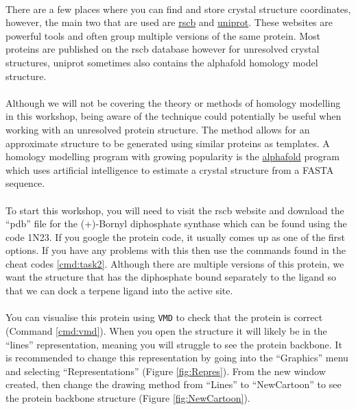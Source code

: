   \paragraph{}
  There are a few places where you can find and store crystal structure coordinates, however, the main two that are used are \href{https://www.rcsb.org/}{rscb} and \href{https://www.uniprot.org/}{uniprot}. These websites are powerful tools and often group multiple versions of the same protein. Most proteins are published on the rscb database however for unresolved crystal structures, uniprot sometimes also contains the alphafold\cite{Varadi2022AlphaFoldModels} homology model structure. 

  \paragraph{}
  Although we will not be covering the theory or methods of homology modelling in this workshop, being aware of the technique could potentially be useful when working with an unresolved protein structure. The method allows for an approximate structure to be generated using similar proteins as templates. A homology modelling program with growing popularity is the \href{https://www.deepmind.com/research/highlighted-research/alphafold}{alphafold}\cite{Varadi2022AlphaFoldModels} program which uses artificial intelligence to estimate a crystal structure from a FASTA sequence.

  \paragraph{}
  To start this workshop, you will need to visit the rscb website and download the \enquote{pdb} file for the (+)-Bornyl diphosphate synthase which can be found using the code 1N23.  If you google the protein code, it usually comes up as one of the first options. If you have any problems with this then use the commands found in the cheat codes \cref{cmd:task2}. Although there are multiple versions of this protein, we want the structure that has the diphosphate bound separately to the ligand so that we can dock a terpene ligand into the active site.

  \paragraph{}
  You can visualise this protein using \texttt{VMD} to check that the protein is correct (Command \ref{cmd:vmd}). When you open the structure it will likely be in the \enquote{lines} representation, meaning you will struggle to see the protein backbone. It is recommended to change this representation by going into the \enquote{Graphics} menu and selecting \enquote{Representations} (Figure \ref{fig:Repres}). From the new window created, then change the drawing method from \enquote{Lines} to \enquote{NewCartoon} to see the protein backbone structure (Figure \ref{fig:NewCartoon}).
    
